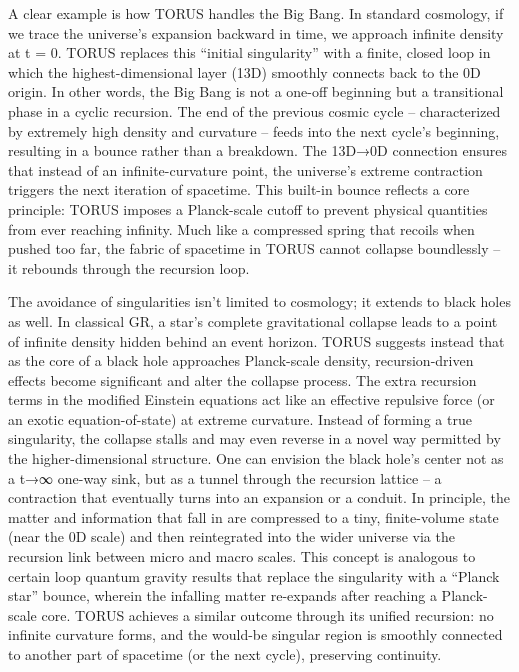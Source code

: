 \documentclass[]{article}
\begin{document}
A clear example is how TORUS handles the Big Bang. In standard
cosmology, if we trace the universe's expansion backward in time, we
approach infinite density at t = 0. TORUS replaces this ``initial
singularity'' with a finite, closed loop in which the
highest-dimensional layer (13D) smoothly connects back to the 0D origin.
In other words, the Big Bang is not a one-off beginning but a
transitional phase in a cyclic recursion. The end of the previous cosmic
cycle -- characterized by extremely high density and curvature -- feeds
into the next cycle's beginning, resulting in a bounce rather than a
breakdown. The 13D→0D connection ensures that instead of an
infinite-curvature point, the universe's extreme contraction triggers
the next iteration of spacetime. This built-in bounce reflects a core
principle: TORUS imposes a Planck-scale cutoff to prevent physical
quantities from ever reaching infinity. Much like a compressed spring
that recoils when pushed too far, the fabric of spacetime in TORUS
cannot collapse boundlessly -- it rebounds through the recursion loop.

The avoidance of singularities isn't limited to cosmology; it extends to
black holes as well. In classical GR, a star's complete gravitational
collapse leads to a point of infinite density hidden behind an event
horizon. TORUS suggests instead that as the core of a black hole
approaches Planck-scale density, recursion-driven effects become
significant and alter the collapse process. The extra recursion terms in
the modified Einstein equations act like an effective repulsive force
(or an exotic equation-of-state) at extreme curvature. Instead of
forming a true singularity, the collapse stalls and may even reverse in
a novel way permitted by the higher-dimensional structure. One can
envision the black hole's center not as a t→∞ one-way sink, but as a
tunnel through the recursion lattice -- a contraction that eventually
turns into an expansion or a conduit. In principle, the matter and
information that fall in are compressed to a tiny, finite-volume state
(near the 0D scale) and then reintegrated into the wider universe via
the recursion link between micro and macro scales. This concept is
analogous to certain loop quantum gravity results that replace the
singularity with a ``Planck star'' bounce, wherein the infalling matter
re-expands after reaching a Planck-scale core. TORUS achieves a similar
outcome through its unified recursion: no infinite curvature forms, and
the would-be singular region is smoothly connected to another part of
spacetime (or the next cycle), preserving continuity.
\end{document}
